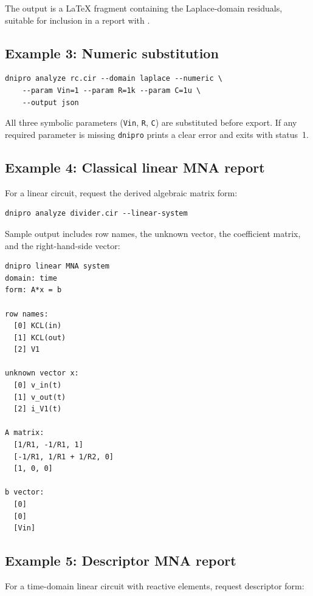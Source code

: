 \documentclass[11pt,a4paper]{article}
\newcommand{\project}{\texttt{dnipro}}
\newcommand{\code}[1]{\texttt{#1}}
\begin{document}
The output is a \LaTeX{} fragment containing the Laplace-domain residuals,
suitable for inclusion in a report with \verb||.

\subsection{Example 3: Numeric substitution}

\begin{lstlisting}[style=shell]
dnipro analyze rc.cir --domain laplace --numeric \
    --param Vin=1 --param R=1k --param C=1u \
    --output json
\end{lstlisting}

All three symbolic parameters (\code{Vin}, \code{R}, \code{C}) are substituted
before export.
If any required parameter is missing \project{} prints a clear error and exits with
status~1.

\subsection{Example 4: Classical linear MNA report}

For a linear circuit, request the derived algebraic matrix form:

\begin{lstlisting}[style=shell]
dnipro analyze divider.cir --linear-system
\end{lstlisting}

Sample output includes row names, the unknown vector, the coefficient matrix,
and the right-hand-side vector:

\begin{lstlisting}
dnipro linear MNA system
domain: time
form: A*x = b

row names:
  [0] KCL(in)
  [1] KCL(out)
  [2] V1

unknown vector x:
  [0] v_in(t)
  [1] v_out(t)
  [2] i_V1(t)

A matrix:
  [1/R1, -1/R1, 1]
  [-1/R1, 1/R1 + 1/R2, 0]
  [1, 0, 0]

b vector:
  [0]
  [0]
  [Vin]
\end{lstlisting}

\subsection{Example 5: Descriptor MNA report}

For a time-domain linear circuit with reactive elements, request descriptor
form:
\end{document}
